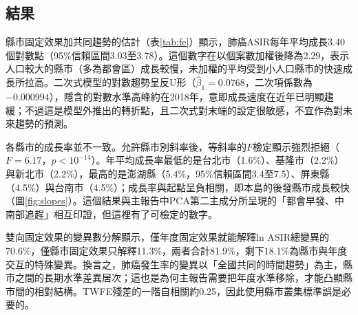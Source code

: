 \documentclass[UTF8,a4paper,11pt]{ctexart}
\begin{document}
\subsection{結果}
縣市固定效果加共同趨勢的估計（表\ref{tab:fe}）顯示，肺癌ASIR每年平均成長3.40個對數點（95\%信賴區間3.03至3.78）。這個數字在以個案數加權後降為2.29，表示人口較大的縣市（多為都會區）成長較慢，未加權的平均受到小人口縣市的快速成長所拉高。二次式模型的對數趨勢呈反U形（$\hat\beta_1=0.0768$，二次項係數為$-0.000994$），隱含的對數水準高峰約在2018年，意即成長速度在近年已明顯趨緩；不過這是模型外推出的轉折點，且二次式對末端的設定很敏感，不宜作為對未來趨勢的預測。

\begin{table}[H]
\centering
\caption{固定效果模型主要結果（因變數為 $\ln$ ASIR；標準誤以縣市為叢集；括號內為標準誤）。}\label{tab:fe}
\small
{}
\end{table}

各縣市的成長率並不一致。允許縣市別斜率後，等斜率的$F$檢定顯示強烈拒絕（$F=6.17$，$p<10^{-14}$）。年平均成長率最低的是台北市（1.6\%）、基隆市（2.2\%）與新北市（2.2\%），最高的是澎湖縣（5.4\%，95\%信賴區間3.4至7.5）、屏東縣（4.5\%）與台南市（4.5\%）；成長率與起點呈負相關，即本島的後發縣市成長較快（圖\ref{fig:slopes}）。這個結果與主報告中PCA第二主成分所呈現的「都會早發、中南部追趕」相互印證，但這裡有了可檢定的數字。

雙向固定效果的變異數分解顯示，僅年度固定效果就能解釋ln ASIR總變異的70.6\%，僅縣市固定效果只解釋11.3\%，兩者合計81.9\%，剩下18.1\%為縣市與年度交互的特殊變異。換言之，肺癌發生率的變異以「全國共同的時間趨勢」為主，縣市之間的長期水準差異居次；這也是為何主報告需要把年度水準移除，才能凸顯縣市間的相對結構。TWFE殘差的一階自相關約0.25，因此使用縣市叢集標準誤是必要的。
\end{document}

